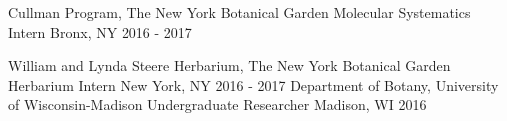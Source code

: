 \begin{cventries}
  \cventry
    {Cullman Program, The New York Botanical Garden} %
    {Molecular Systematics Intern} %
    {Bronx, NY} %
    {2016 - 2017} %
    {
    }

  \cventry
    {William and Lynda Steere Herbarium, The New York Botanical Garden} %
    {Herbarium Intern} %
    {New York, NY} %
    {2016 - 2017} %
    {
    }    
     \cventry
    {Department of Botany, University of Wisconsin-Madison} %
    {Undergraduate Researcher} %
    {Madison, WI} %
    {2016} %
    {
    }    
\end{cventries}
